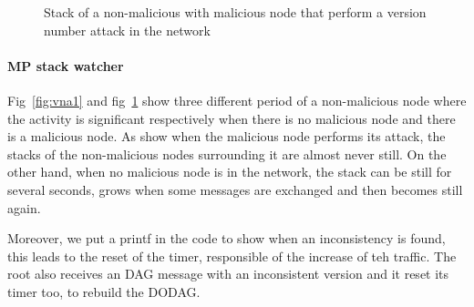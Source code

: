 \documentclass[11pt]{report}
\begin{document}
\begin{figure}
    \caption{Stack of a non-malicious with malicious node that perform
    a version number attack in the network}
\label{fig:vna2}
\end{figure}

\paragraph{MP stack watcher}
Fig~\ref{fig:vna1} and fig~\ref{fig:vna2} show
three different period of a non-malicious node
where the activity is significant respectively when there is no
malicious node and there is a malicious node.
As show when the malicious node performs its attack, the stacks of the
non-malicious nodes surrounding it are almost never still. On the other
hand, when no malicious node is in the network, the stack can be still
for several seconds, grows when some messages are exchanged and then
becomes still again.

Moreover, we put a printf in the code to show when an inconsistency is
found, this leads to the reset of the timer, responsible of the increase
of teh traffic. The root also receives an DAG message with an
inconsistent version and it reset its timer too, to rebuild the \textsc{DODAG}.\\
\end{document}
